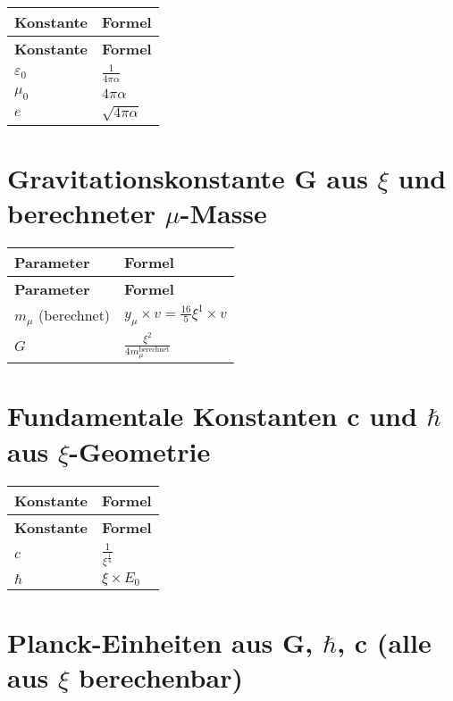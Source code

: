 \documentclass[12pt,a4paper]{article}
\begin{document}
	\begin{longtable}{|p{3cm}|p{4cm}|}
		\hline
		\textbf{Konstante} & \textbf{Formel} \\
		\hline
		\endfirsthead
		\hline
		\textbf{Konstante} & \textbf{Formel} \\
		\hline
		\endhead
		\(\varepsilon_0\) & \(\frac{1}{4\pi\alpha}\) \\
		\hline
		\(\mu_0\) & \(4\pi\alpha\) \\
		\hline
		\(e\) & \(\sqrt{4\pi\alpha}\) \\
		\hline
	\end{longtable}
	
	\section{Gravitationskonstante G aus \(\xi\) und berechneter \(\mu\)-Masse}
	
	\begin{longtable}{|p{3cm}|p{5cm}|}
		\hline
		\textbf{Parameter} & \textbf{Formel} \\
		\hline
		\endfirsthead
		\hline
		\textbf{Parameter} & \textbf{Formel} \\
		\hline
		\endhead
		\(m_{\mu}\) (berechnet) & \(y_{\mu} \times v = \frac{16}{5}\xi^{1} \times v\) \\
		\hline
		\(G\) & \(\frac{\xi^{2}}{4m_{\mu}^{\text{berechnet}}}\) \\
		\hline
	\end{longtable}
	
	\section{Fundamentale Konstanten c und \(\hbar\) aus \(\xi\)-Geometrie}
	
	\begin{longtable}{|p{3cm}|p{5cm}|}
		\hline
		\textbf{Konstante} & \textbf{Formel} \\
		\hline
		\endfirsthead
		\hline
		\textbf{Konstante} & \textbf{Formel} \\
		\hline
		\endhead
		\(c\) & \(\frac{1}{\xi^{\frac{1}{4}}}\) \\
		\hline
		\(\hbar\) & \(\xi \times E_0\) \\
		\hline
	\end{longtable}
	
	\section{Planck-Einheiten aus G, \(\hbar\), c (alle aus \(\xi\) berechenbar)}
	
\end{document}
